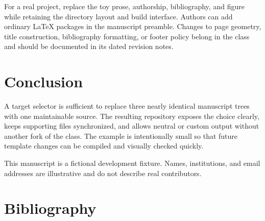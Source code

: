 \documentclass[times,twoside]{_Templates/MultiTargetManuscript}
\begin{document}
For a real project, replace the toy prose, authorship, bibliography, and figure
while retaining the directory layout and build interface. Authors can add
ordinary LaTeX packages in the manuscript preamble. Changes to page geometry,
title construction, bibliography formatting, or footer policy belong in the
class and should be documented in its dated revision notes.

\section*{Conclusion}

A target selector is sufficient to replace three nearly identical manuscript
trees with one maintainable source. The resulting repository exposes the choice
clearly, keeps supporting files synchronized, and allows neutral or custom output
without another fork of the class. The example is intentionally small so that
future template changes can be compiled and visually checked quickly.

\begin{acknowledgements}
This manuscript is a fictional development fixture. Names, institutions, and
email addresses are illustrative and do not describe real contributors.
\end{acknowledgements}

\section*{Bibliography}
\begingroup
\setlength{\emergencystretch}{5em}
\sloppy

\endgroup
\end{document}
